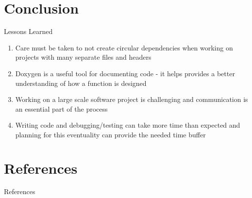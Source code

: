 \documentclass[10pt, handout, aspectratio=169]{beamer}
\begin{document}
\section{Conclusion}%
	\begin{frame}{Lessons Learned}
		\begin{enumerate}
			\item Care must be taken to not create circular dependencies when working on projects with many separate files and headers
			\item Doxygen is a useful tool for documenting code - it helps provides a better understanding of how a function is designed
			\item Working on a large scale software project is challenging and communication is an essential part of the process
			\item Writing code and debugging/testing can take more time than expected and planning for this eventuality can provide the needed time buffer
		\end{enumerate}
	\end{frame}

\section{References}%

	\begin{frame}[t]{References}
			\footnotesize
			 
	\end{frame}
\end{document}
